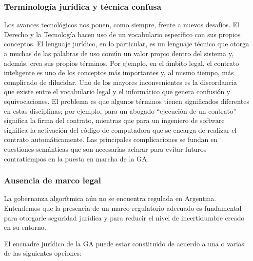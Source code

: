 \documentclass[12pt]{report} %
\begin{document}
\subsubsection{Terminología jurídica y técnica confusa}

Los avances tecnológicos nos ponen, como siempre, frente a nuevos desafíos. El Derecho y la Tecnología hacen uso de un vocabulario específico con sus propios conceptos. El lenguaje jurídico, en lo particular, es un lenguaje técnico que otorga a muchas de las palabras de uso común un valor propio dentro del sistema y, además, crea sus propios términos. Por ejemplo, en el ámbito legal, el contrato inteligente es uno de los conceptos más importantes y, al mismo tiempo, más complicado de dilucidar. Uno de los mayores inconvenientes es la discordancia que existe entre el vocabulario legal y el informático que genera confusión y equivocaciones. El problema es que algunos términos tienen significados diferentes en estas disciplinas; por ejemplo, para un abogado “ejecución de un contrato” significa la firma del contrato, mientras que para un ingeniero de software significa la activación del código de computadora que se encarga de realizar el contrato automáticamente. Las principales complicaciones se fundan en cuestiones semánticas que son necesarias  aclarar para evitar futuros contratiempos en la puesta en marcha de la GA.

\subsubsection{Ausencia de marco legal }

La gobernanza algorítmica aún no se encuentra regulada en Argentina. Entendemos que la presencia de un marco regulatorio adecuado es fundamental para otorgarle seguridad jurídica y para reducir el nivel de incertidumbre creado en su entorno. 

El encuadre jurídico de la GA puede estar constituido de acuerdo a una o varias de las siguientes opciones:
\end{document}
